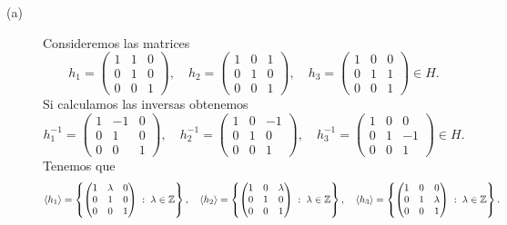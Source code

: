 \documentclass{article}
\begin{document}
\begin{sol}
\begin{description}
\item[(a)] Consideremos las matrices
	\[h_{1} = \begin{pmatrix} 1 & 1 & 0 \\ 0 & 1 & 0 \\ 0 & 0 & 1 \end{pmatrix}, \quad h_{2} = \begin{pmatrix} 1 & 0 & 1 \\ 0 & 1 & 0 \\ 0 & 0 & 1 \end{pmatrix}, \quad h_{3} = \begin{pmatrix} 1 & 0 & 0 \\ 0 & 1 & 1 \\ 0 & 0 & 1 \end{pmatrix} \in H .\]
Si calculamos las inversas obtenemos 
\[ h_{1}^{-1} = \begin{pmatrix} 1 & -1 & 0 \\ 0 & 1 & 0 \\ 0 & 0 & 1 \end{pmatrix}, \quad h_{2}^{-1} = \begin{pmatrix} 1 & 0 &-1 \\ 0 & 1 & 0 \\ 0 & 0 & 1 \end{pmatrix}, \quad h_{3}^{-1} = \begin{pmatrix} 1 & 0 & 0 \\ 0 & 1 & -1 \\ 0 & 0 & 1 \end{pmatrix} \in H.\]
Tenemos que 
\[\left\langle h_{1} \right\rangle = \left\{ \begin{pmatrix} 1 & \lambda & 0 \\ 0 & 1 & 0 \\ 0 & 0 & 1 \end{pmatrix}\; : \; \lambda \in \mathbb{Z}\right\} , \quad \left\langle h_{2} \right\rangle = \left\{\begin{pmatrix}  1 & 0 & \lambda \\ 0 & 1 & 0 \\ 0 & 0 & 1 \end{pmatrix}\; : \; \lambda \in \mathbb{Z}\right\} , \quad \left\langle h_{3} \right\rangle = \left\{ \begin{pmatrix} 1 & 0 & 0 \\ 0 & 1 & \lambda \\ 0 & 0 & 1 \end{pmatrix}\; : \; \lambda \in \mathbb{Z}\right\}  .\]

\end{description}
\end{sol}
\end{document}
